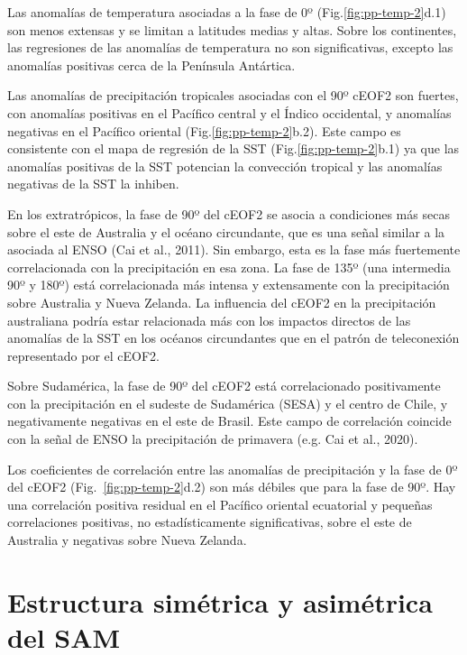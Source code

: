 \documentclass[12pt,oneside]{reedthesis}
\begin{document}
Las anomalías de temperatura asociadas a la fase de 0º (Fig.\ref{fig:pp-temp-2}d.1) son menos extensas y se limitan a latitudes medias y altas.
Sobre los continentes, las regresiones de las anomalías de temperatura no son significativas, excepto las anomalías positivas cerca de la Península Antártica.

Las anomalías de precipitación tropicales asociadas con el 90º cEOF2 son fuertes, con anomalías positivas en el Pacífico central y el Índico occidental, y anomalías negativas en el Pacífico oriental (Fig.\ref{fig:pp-temp-2}b.2).
Este campo es consistente con el mapa de regresión de la SST (Fig.\ref{fig:pp-temp-2}b.1) ya que las anomalías positivas de la SST potencian la convección tropical y las anomalías negativas de la SST la inhiben.

En los extratrópicos, la fase de 90º del cEOF2 se asocia a condiciones más secas sobre el este de Australia y el océano circundante, que es una señal similar a la asociada al ENSO (Cai et al., 2011).
Sin embargo, esta es la fase más fuertemente correlacionada con la precipitación en esa zona.
La fase de 135º (una intermedia 90º y 180º) está correlacionada más intensa y extensamente con la precipitación sobre Australia y Nueva Zelanda.
La influencia del cEOF2 en la precipitación australiana podría estar relacionada más con los impactos directos de las anomalías de la SST en los océanos circundantes que en el patrón de teleconexión representado por el cEOF2.

Sobre Sudamérica, la fase de 90º del cEOF2 está correlacionado positivamente con la precipitación en el sudeste de Sudamérica (SESA) y el centro de Chile, y negativamente negativas en el este de Brasil.
Este campo de correlación coincide con la señal de ENSO la precipitación de primavera (e.g. Cai et al., 2020).

Los coeficientes de correlación entre las anomalías de precipitación y la fase de 0º del cEOF2 (Fig.~\ref{fig:pp-temp-2}d.2) son más débiles que para la fase de 90º.
Hay una correlación positiva residual en el Pacífico oriental ecuatorial y pequeñas correlaciones positivas, no estadísticamente significativas, sobre el este de Australia y negativas sobre Nueva Zelanda.

\hypertarget{estructura-simuxe9trica-y-asimuxe9trica-del-sam}{%
\section{Estructura simétrica y asimétrica del SAM}\label{estructura-simuxe9trica-y-asimuxe9trica-del-sam}}
\end{document}
